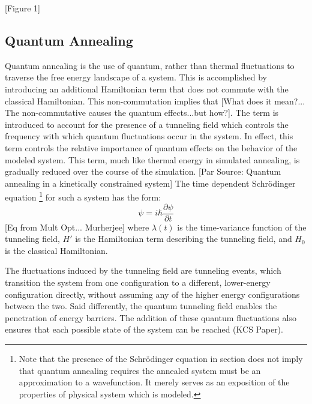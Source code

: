\documentclass[11pt]{afthesis}
\begin{document}
[Figure 1] 



\subsection{Quantum Annealing}

Quantum annealing is the use of quantum, rather than thermal fluctuations to traverse the free energy landscape of a system. This is accomplished by introducing an additional Hamiltonian term that does not commute with the classical Hamiltonian. This non-commutation implies that [What does it mean?... The non-commutative causes the quantum effects...but how?].  The term is introduced to account for the presence of a tunneling field which controls the frequency with which quantum fluctuations occur in the system. In effect, this term controls the relative importance of quantum effects on the behavior of the modeled system. This term, much like thermal energy in simulated annealing, is gradually reduced over the course of the simulation. [Par Source: Quantum annealing in a kinetically constrained system] The time dependent Schrödinger equation \footnote{Note that the presence of the Schrödinger equation in section does not imply that quantum annealing requires the annealed system must be an approximation to a wavefunction. It merely serves as an exposition of the properties of physical system which is modeled.} for such a system has the form: \begin{equation}
[\lambda(t)H' + H_0]\psi = i\hbar \frac{\partial \psi}{\partial t}
\end{equation} [Eq from Mult Opt... Murherjee] where \begin{math} \lambda(t) \end{math} is the time-variance function of the tunneling field, \begin{math} H' \end{math} is the Hamiltonian term describing the tunneling field, and \begin{math} H_0 \end{math} is the classical Hamiltonian. 

The fluctuations induced by the tunneling field are tunneling events, which transition the system from one configuration to a different, lower-energy configuration directly, without assuming any of the higher energy configurations between the two. Said differently, the quantum tunneling field enables the penetration of energy barriers. The addition of these quantum fluctuations also ensures that each possible state of the system can be reached (KCS Paper). 
\end{document}

